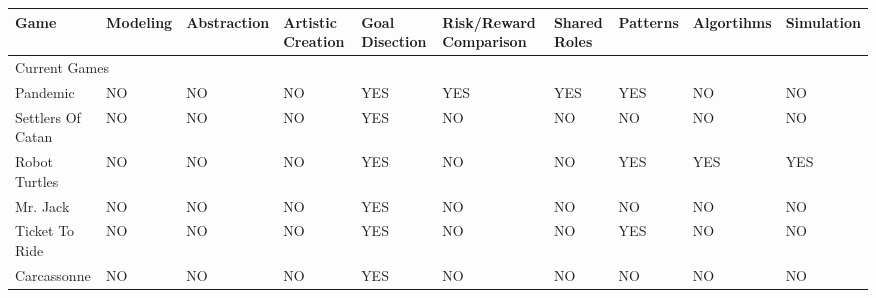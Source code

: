 \documentclass{acm_proc_article-sp}
\begin{document}
\clearpage
\begin{sidewaystable}[htbp]
    \vspace*{-9cm}\hspace*{-1cm}\begin{tabular}{|p{2cm}||p{1.5cm}|p{2.5cm}|p{2.5cm}|p{2.7cm}|p{2cm}|p{1.5cm}|p{2cm}|p{4.2cm}|p{1.5cm}|}
    
    \hline

    Game
    & Modeling
    & Abstraction
    & Artistic Creation
    & Goal Disection
    & Risk/Reward Comparison
    & Shared Roles
    & Patterns
    & Algortihms
    & Simulation \\ \hline \hline
    
    \multicolumn{10}{|l|}{Current Games}  \\ \hline \hline
    
    Pandemic
      & NO
      & NO
      & NO 
      & \cellcolor{blue!25}YES 
      & \cellcolor{blue!25}YES 
      & \cellcolor{blue!25}YES 
      & \cellcolor{blue!25}YES 
      & NO 
      & NO \\ \hline
    
    Settlers Of Catan 
      & NO 
      & NO 
      & NO 
      & \cellcolor{blue!25}YES 
      & NO 
      & NO 
      & NO 
      & NO 
      & NO \\ \hline

    Robot Turtles 
      & NO 
      & NO 
      & NO 
      & \cellcolor{blue!25}YES 
      & NO 
      & NO 
      & \cellcolor{blue!25}YES 
      & \cellcolor{blue!25}YES 
      & \cellcolor{blue!25}YES \\ \hline

    Mr. Jack 
      & NO 
      & NO 
      & NO 
      & \cellcolor{blue!25}YES 
      & NO 
      & NO 
      & NO 
      & NO 
      & NO \\ \hline

    Ticket To Ride 
      & NO 
      & NO 
      & NO 
      & \cellcolor{blue!25}YES 
      & NO 
      & NO 
      & \cellcolor{blue!25}YES 
      & NO 
      & NO \\ \hline

    Carcassonne 
      & NO 
      & NO 
      & NO 
      & \cellcolor{blue!25}YES 
      & NO 
      & NO 
      & NO 
      & NO 
      & NO \\ \hline


\end{tabular}
\end{sidewaystable}
\end{document}
